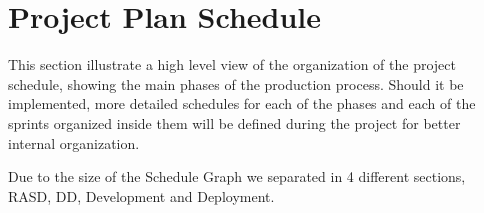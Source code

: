 \documentclass[a4paper]{article}
\begin{document}
\section{Project Plan Schedule}
This section illustrate a high level view of the organization of the project schedule, showing the main phases of the production process. Should it be implemented, more detailed schedules for each of the phases and each of the sprints organized inside them will be defined during the project for better internal organization.\par
Due to the size of the Schedule Graph we separated in 4 different sections, RASD, DD, Development and Deployment.
\newline \par
\begin{figure}[h]
\centering
\vspace*{\fill}
\noindent{}%
\vspace*{0cm}
\end{figure}
\begin{figure}[h]
\centering
\vspace*{\fill}
\noindent{}%
\vspace*{0cm}
\end{figure}
\end{document}
